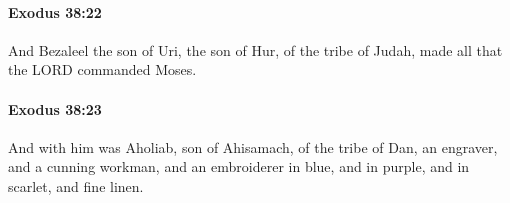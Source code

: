 		\paragraph{Exodus 38:22} %
			\label{EXODUS-38-22}

			And Bezaleel the son of Uri, the son of Hur, of the tribe of Judah, made all that the LORD commanded Moses.


		\paragraph{Exodus 38:23} %
			\label{EXODUS-38-23}

			And with him was Aholiab, son of Ahisamach, of the tribe of Dan, an engraver, and a cunning workman, and an embroiderer in blue, and in purple, and in scarlet, and fine linen.



